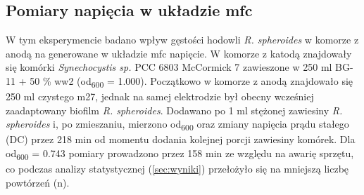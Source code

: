 \subsection{Pomiary napięcia w układzie \acrshort{mfc}}\label{subsec:volt}
W tym eksperymencie badano wpływ gęstości hodowli
\textit{R. spheroides} w komorze z anodą na generowane
w układzie \acrshort{mfc} napięcie.
W komorze z katodą znajdowały się komórki
\textit{Synechocystis sp.} PCC 6803 McCormick 7
zawieszone w 250 ml BG-11 + 50 \% \acrshort{ww}2
(\acrshort{od}\textsubscript{600} = 1.000).
Początkowo w komorze z anodą znajdowało się 250 ml
czystego \acrshort{m27}, jednak na samej elektrodzie był
obecny wcześniej zaadaptowany biofilm \textit{R. spheroides}.
Dodawano po 1 ml stężonej zawiesiny \textit{R. spheroides}
i, po zmieszaniu, mierzono \acrshort{od}\textsubscript{600} oraz
zmiany napięcia prądu stałego (DC) przez 218 min od
momentu dodania kolejnej porcji zawiesiny komórek.
Dla \acrshort{od}\textsubscript{600} = 0.743 pomiary prowadzono
przez 158 min ze względu na awarię sprzętu, co podczas
analizy statystycznej (\ref{sec:wyniki}) przełożyło się
na mniejszą liczbę powtórzeń (n).

